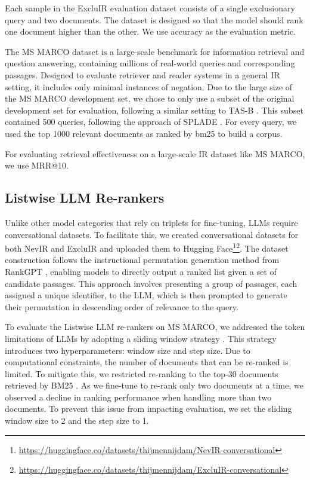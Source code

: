 Each sample in the ExcluIR evaluation dataset consists of a single exclusionary query and two documents. The dataset is designed so that the model should rank one document higher than the other. We use accuracy as the evaluation metric.

The MS MARCO dataset \cite{bajaj2016ms} is a large-scale benchmark for information retrieval and question answering, containing millions of real-world queries and corresponding passages. Designed to evaluate retriever and reader systems in a general IR setting, it includes only minimal instances of negation. Due to the large size of the MS MARCO development set, we chose to only use a subset of the original development set for evaluation, following a similar setting to TAS-B \cite{hofstatter2021efficiently}. This subset contained 500 queries, following the approach of SPLADE \cite{formal2021splade}. For every query, we used the top 1000 relevant documents as ranked by bm25 to build a corpus. 

For evaluating retrieval effectiveness on a large-scale IR dataset like MS MARCO, we use MRR@10.



\subsection{Listwise LLM Re-rankers}
Unlike other model categories that rely on triplets for fine-tuning, LLMs require conversational datasets. To facilitate this, we created conversational datasets for both NevIR and ExcluIR and uploaded them to Hugging Face\footnote{\url{https://huggingface.co/datasets/thijmennijdam/NevIR-conversational}}\footnote{\url{https://huggingface.co/datasets/thijmennijdam/ExcluIR-conversational}}. The dataset construction follows the instructional permutation generation method from RankGPT \cite{rankGPT}, enabling models to directly output a ranked list given a set of candidate passages. This approach involves presenting a group of passages, each assigned a unique identifier, to the LLM, which is then prompted to generate their permutation in descending order of relevance to the query.

To evaluate the Listwise LLM re-rankers on MS MARCO, we addressed the token limitations of LLMs by adopting a sliding window strategy \cite{rankGPT}. This strategy introduces two hyperparameters: window size and step size. Due to computational constraints, the number of documents that can be re-ranked is limited. To mitigate this, we restricted re-ranking to the top-30 documents retrieved by BM25 \cite{bm25}. As we fine-tune to re-rank only two documents at a time, we observed a decline in ranking performance when handling more than two documents. To prevent this issue from impacting evaluation, we set the sliding window size to 2 and the step size to 1.

